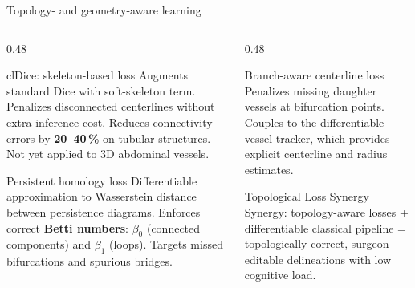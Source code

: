 \documentclass[aspectratio=169,11pt,xcolor=table]{beamer}
\begin{document}
\begin{frame}{Topology- and geometry-aware learning}
\footnotesize
\begin{columns}[T]
\begin{column}{0.48\linewidth}
\begin{block}{clDice: skeleton-based loss}
\scriptsize
Augments standard Dice with soft-skeleton term. Penalizes disconnected centerlines without extra inference cost. Reduces connectivity errors by \textbf{20--40\,\%} on tubular structures. Not yet applied to 3D abdominal vessels.
\end{block}
\vspace{0.1cm}
\begin{block}{Persistent homology loss}
\scriptsize
Differentiable approximation to Wasserstein distance between persistence diagrams. Enforces correct \textbf{Betti numbers}: $\beta_0$ (connected components) and $\beta_1$ (loops). Targets missed bifurcations and spurious bridges.
\end{block}
\end{column}
\begin{column}{0.48\linewidth}
\begin{block}{Branch-aware centerline loss}
\scriptsize
Penalizes missing daughter vessels at bifurcation points. Couples to the differentiable vessel tracker, which provides explicit centerline and radius estimates.
\end{block}
\vspace{0.15cm}
\begin{alertblock}{Topological Loss Synergy}
\scriptsize
Synergy: topology-aware losses + differentiable classical pipeline = topologically correct, surgeon-editable delineations with low cognitive load.
\end{alertblock}
\end{column}
\end{columns}
\end{frame}
\end{document}
